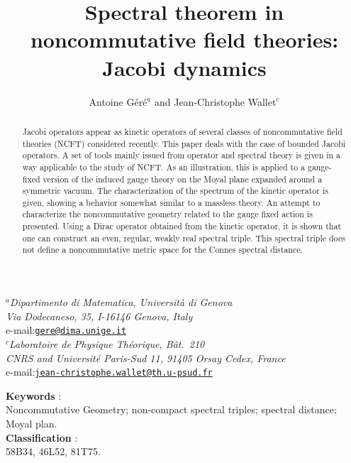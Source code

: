 \documentclass[a4paper,11pt,twoside]{article}
\makeatletter
\numberwithin{equation}{section}
\theoremstyle{nonumberplain}
\newcommand{\institute}[1]{\newcommand{\@institute}{#1}}
\renewcommand{\maketitle}{
%
\vspace*{0.5\baselineskip}
%
{%
\center\LARGE\noindent\@title\par
}%
%
\vspace{1.5\baselineskip}
%
{%
\center\normalsize\noindent\ignorespaces\@author\par
}%
%
\vspace{0.5\baselineskip}
%
{%
\center\normalsize\ignorespaces\@institute\par
}%
%
\vspace{2\baselineskip}
%
}%
\makeatother
\begin{document}

\title{Spectral theorem in noncommutative field theories: Jacobi dynamics}

\author{Antoine G\'er\'e$^a$ and Jean-Christophe Wallet$^c$}

\institute{%
%
\textit{$^a$Dipartimento di Matematica, Universit\`a di Genova\\
Via Dodecaneso, 35, I-16146 Genova, Italy}\\
e-mail:\href{mailto:gere@dima.unige.it}{\texttt{gere@dima.unige.it}}\\[1ex]%
%
\textit{$^c$Laboratoire de Physique Th\'eorique, B\^at.\ 210\\
CNRS and Universit\'e Paris-Sud 11,  91405 Orsay Cedex, France}\\
e-mail:\href{mailto:jean-christophe.wallet@th.u-psud.fr}{\texttt{jean-christophe.wallet@th.u-psud.fr}}%
%
}%

\maketitle


{{
%
\small
%
\begin{center}
\textbf{Keywords} : \\ 
Noncommutative Geometry; non-compact spectral triples; spectral distance; Moyal plan.\\[8pt]

\textbf{Classification} :  \\
58B34, 46L52, 81T75. 
\end{center}

}}


\begin{abstract}
Jacobi operators appear as kinetic operators of several classes of noncommutative field theories (NCFT) considered recently. This paper deals with the case of bounded Jacobi operators. A set of tools mainly issued from operator and spectral theory is given in a way applicable to the study of NCFT. As an illustration, this is applied to a gauge-fixed version of the induced gauge theory on the Moyal plane expanded around a symmetric vacuum. The characterization of the spectrum of the kinetic operator is given, showing a behavior somewhat similar to a massless theory. An attempt to characterize the noncommutative geometry related to the gauge fixed action is presented. Using a Dirac operator obtained from the kinetic operator, it is shown that one can construct an even, regular, weakly real spectral triple. This spectral triple does not define a noncommutative metric space for the Connes spectral distance.
\end{abstract}
\end{document}
